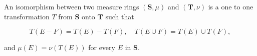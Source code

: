 An isomorphism between two measure rings $(\mathbf{S}, \mu)$ and $(\mathbf{T}, \nu)$ is a one to one transformation $T$ from $\mathbf{S}$ onto $\mathbf{T}$ such that

$$T(E - F) = T(E) - T(F), \quad T(E \cup F) = T(E) \cup T(F),$$

and $\mu(E) = \nu(T(E))$ for every $E$ in $\mathbf{S}$.
